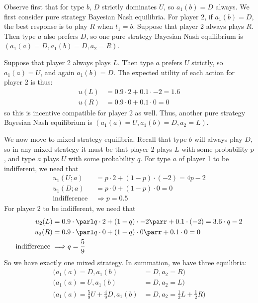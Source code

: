 \documentclass[10pt]{article}
\begin{document}
Observe first that for type $b$, $D$ strictly dominates $U$, so $a_1(b) = D$ always. We first consider pure strategy Bayesian Nash equilibria. For player 2, if $a_1(b) = D$, the best response is to play $R$ when $t_1 = b$. Suppose that player 2 always plays $R$. Then type $a$ also prefers $D$, so one pure strategy Bayesian Nash equilibrium is $(a_1(a) = D,a_1(b)=D,a_2 = R)$. 

Suppose that player 2 always plays $L$. Then type $a$ prefers $U$ strictly, so $a_1(a) = U$, and again $a_1(b)=D$. The expected utility of each action for player 2 is thus:\begin{align*} u(L) &= 0.9 \cdot 2 + 0.1 \cdot -2 = 1.6 \\ u(R) &= 0.9 \cdot 0 + 0.1 \cdot 0 = 0\end{align*}so this is incentive compatible for player 2 as well. Thus, another pure strategy Bayesian Nash equilibrium is $(a_1(a) = U,a_1(b)=D,a_2 = L)$.

We now move to mixed strategy equilibria. Recall that type $b$ will always play $D$, so in any mixed strategy it must be that player 2 plays $L$ with some probability $p$, and type $a$ plays $U$ with some probability $q$. For type $a$ of player 1 to be indifferent, we need that
\begin{align*}
	u_1(U;a) &= p \cdot 2 + (1-p) \cdot (-2) = 4p - 2 \\
	u_1(D;a) &= p \cdot 0 + (1-p) \cdot 0 = 0 \\
	\text{indifference } &\Longrightarrow p = 0.5
\end{align*}
For player 2 to be indifferent, we need that
\begin{align*}
	u_2(L) &= 0.9 \cdot \parl q \cdot 2 + (1-q) \cdot -2\parr + 0.1 \cdot (-2) = 3.6 \cdot q - 2 \\
	u_2(R) &= 0.9 \cdot \parl q \cdot 0 + (1-q) \cdot 0\parr + 0.1 \cdot 0 = 0 \\
	\text{indifference } &\Longrightarrow q = \frac{5}{9}
\end{align*}
So we have exactly one mixed strategy. In summation, we have three equilibria:
\begin{align*}
	(a_1(a) = D,a_1(b)&=D,a_2 = R)\\
	(a_1(a) = U,a_1(b)&=D,a_2 = L) \\
	\Bigg(a_1(a) = \frac{5}{9} U + \frac{4}{9} D,a_1(b) &= D,a_2 = \frac{1}{2} L + \frac{1}{2}R \Bigg)
\end{align*}
\end{document}
